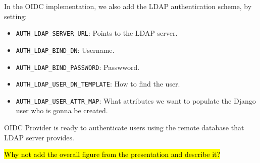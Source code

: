 In the OIDC implementation, we also add the LDAP authentication scheme, by setting:

\begin{itemize}

	\item \verb|AUTH_LDAP_SERVER_URL|: Points to the LDAP server.

	\item \verb|AUTH_LDAP_BIND_DN|: Username.

	\item \verb|AUTH_LDAP_BIND_PASSWORD|: Passwword.

	\item \verb|AUTH_LDAP_USER_DN_TEMPLATE|: How to find the user.

	\item \verb|AUTH_LDAP_USER_ATTR_MAP|: What attributes we want to populate the Django user who is gonna be created.

\end{itemize}
OIDC Provider is ready to authenticate users using the remote database that LDAP server provides.

\hl{Why not add the overall figure from the presentation and describe it?}
